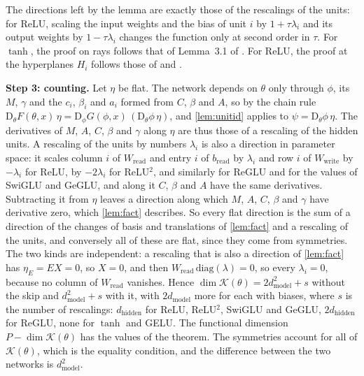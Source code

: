 \documentclass[10pt]{article}
\theoremstyle{definition}
\theoremstyle{remark}
\newcommand{\Wread}{W_{\mathrm{read}}}
\newcommand{\Wwrite}{W_{\mathrm{write}}}
\newcommand{\dm}{d_{\mathrm{model}}}
\newcommand{\dhid}{d_{\mathrm{hidden}}}
\newcommand{\Der}{\mathrm{D}}
\newcommand{\para}[1]{\smallskip\noindent\textbf{#1}\hspace{0.5em}}
\begin{document}
The directions left by the lemma are exactly those of the rescalings of the units: for ReLU, scaling the input weights and the bias of unit $i$ by $1 + \tau\lambda_i$ and its output weights by $1 - \tau\lambda_i$ changes the function only at second order in $\tau$. For $\tanh$, the proof on rays follows that of Lemma~3.1 of \citet{sussmann1992}. For ReLU, the proof at the hyperplanes $H_i$ follows those of \citet[Lemma~2]{petzka2020symmetries} and \citet[Theorem~6]{stock2021embedding}.

\para{Step 3: counting.} Let $\eta$ be flat. The network depends on $\theta$ only through $\phi$, its $M$, $\gamma$ and the $c_i$, $\beta_i$ and $a_i$ formed from $C$, $\beta$ and $A$, so by the chain rule $\Der_\theta F(\theta, x)\,\eta = \Der_\phi G(\phi, x)\,(\Der_\theta\phi\,\eta)$, and \cref{lem:unitid} applies to $\psi = \Der_\theta\phi\,\eta$. The derivatives of $M$, $A$, $C$, $\beta$ and $\gamma$ along $\eta$ are thus those of a rescaling of the hidden units. A rescaling of the units by numbers $\lambda_i$ is also a direction in parameter space: it scales column $i$ of $\Wread$ and entry $i$ of $b_{\mathrm{read}}$ by $\lambda_i$ and row $i$ of $\Wwrite$ by $-\lambda_i$ for ReLU, by $-2\lambda_i$ for ReLU$^2$, and similarly for ReGLU and for the values of SwiGLU and GeGLU, and along it $C$, $\beta$ and $A$ have the same derivatives. Subtracting it from $\eta$ leaves a direction along which $M$, $A$, $C$, $\beta$ and $\gamma$ have derivative zero, which \cref{lem:fact} describes. So every flat direction is the sum of a direction of the changes of basis and translations of \cref{lem:fact} and a rescaling of the units, and conversely all of these are flat, since they come from symmetries. The two kinds are independent: a rescaling that is also a direction of \cref{lem:fact} has $\eta_E = EX = 0$, so $X = 0$, and then $\Wread\,\mathrm{diag}(\lambda) = 0$, so every $\lambda_i = 0$, because no column of $\Wread$ vanishes. Hence $\dim\mathcal K(\theta) = 2\dm^2 + s$ without the skip and $\dm^2 + s$ with it, with $2\dm$ more for each with biases, where $s$ is the number of rescalings: $\dhid$ for ReLU, ReLU$^2$, SwiGLU and GeGLU, $2\dhid$ for ReGLU, none for $\tanh$ and GELU. The functional dimension $P - \dim\mathcal K(\theta)$ has the values of the theorem. The symmetries account for all of $\mathcal K(\theta)$, which is the equality condition, and the difference between the two networks is $\dm^2$.
\end{document}
